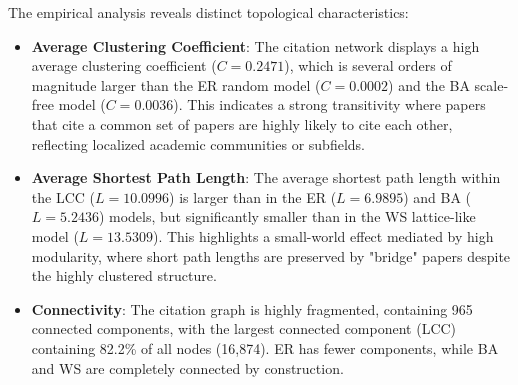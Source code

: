 \documentclass[11pt,a4paper]{article}
\begin{document}
\begin{table}[H]
\centering
\caption{Comparative analysis of structural metrics between the undirected arXiv citation network (filtered 2000--2012) and random network models.}
\label{tab:network_metrics}
\end{table}

The empirical analysis reveals distinct topological characteristics:
\begin{itemize}
    \item \textbf{Average Clustering Coefficient}: The citation network displays a high average clustering coefficient ($C = 0.2471$), which is several orders of magnitude larger than the ER random model ($C = 0.0002$) and the BA scale-free model ($C = 0.0036$). This indicates a strong transitivity where papers that cite a common set of papers are highly likely to cite each other, reflecting localized academic communities or subfields.
    \item \textbf{Average Shortest Path Length}: The average shortest path length within the LCC ($L = 10.0996$) is larger than in the ER ($L = 6.9895$) and BA ($L = 5.2436$) models, but significantly smaller than in the WS lattice-like model ($L = 13.5309$). This highlights a small-world effect mediated by high modularity, where short path lengths are preserved by "bridge" papers despite the highly clustered structure.
    \item \textbf{Connectivity}: The citation graph is highly fragmented, containing 965 connected components, with the largest connected component (LCC) containing 82.2\% of all nodes (16,874). ER has fewer components, while BA and WS are completely connected by construction.
\end{itemize}
\end{document}
